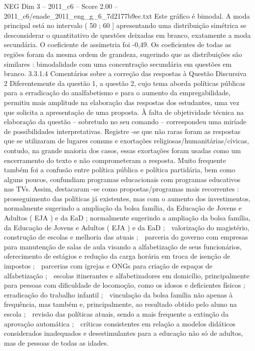\begin{textsample}{NEG Dim 3 – 2011\_c6 – Score 2.00 – 2011\_c6/enade\_2011\_eng\_g\_6\_7d2177b9ec.txt}
Este gráfico é bimodal.
A moda principal está no intervalo ( 50 ; 60 ] apresentando uma distribuição simétrica se desconsiderar o quantitativo de questões deixadas em branco, exatamente a moda secundária.
O coeficiente de assimetria foi -0,49.
Os coeficientes de todas as regiões foram da mesma ordem de grandeza, sugerindo que as distribuições são similares : bimodalidade com uma concentração secundária em questões em branco. 3.3.1.4 Comentários sobre a correção das respostas à Questão Discursiva 2 Diferentemente da questão 1, a questão 2, cujo tema aborda políticas públicas para a erradicação do analfabetismo e para o aumento da empregabilidade, permitiu mais amplitude na elaboração das respostas dos estudantes, uma vez que solicita a apresentação de uma proposta.
À falta de objetividade técnica na elaboração da questão – sobretudo no seu comando – correspondeu uma miríade de possibilidades interpretativas.
Registre -se que não raras foram as respostas que se utilizaram de lugares comuns e exortações religiosas/humanitárias/cívicas, contudo, na grande maioria dos casos, essas exortações foram usadas como um encerramento do texto e não comprometeram a resposta.
Muito frequente também foi a confusão entre política pública e política partidária, bem como alguns poucos, confundiam programas educacionais com programas educativos nas TVs.
Assim, destacaram -se como propostas/programas mais recorrentes :  prosseguimento das políticas já existentes, mas com o aumento dos investimentos, normalmente sugerindo a ampliação da bolsa família, da Educação de Jovens e Adultos ( EJA ) e da EaD ; normalmente sugerindo a ampliação da bolsa família, da Educação de Jovens e Adultos ( EJA ) e da EaD ;  valorização do magistério, construção de escolas e melhoria das atuais ;  parceria do governo com empresas para manutenção de salas de aula visando a alfabetização de seus funcionários, oferecimento de estágios e redução da carga horária em troca de isenção de impostos ;  parcerias com igrejas e ONGs para criação de espaços de alfabetização ;  escolas itinerantes e alfabetizadores em domicílio, principalmente para pessoas com dificuldade de locomoção, como os idosos e deficientes físicos ;  erradicação do trabalho infantil ;  vinculação da bolsa família não apenas à frequência, mas também e, principalmente, ao resultado obtido pelo aluno na escola ;  revisão das políticas atuais, sendo a mais frequente a extinção da aprovação automática ;  críticas consistentes em relação a modelos didáticos considerados inadequados e desestimulantes para a educação não só de adultos, mas de pessoas de todas as idades.

\end{textsample}
